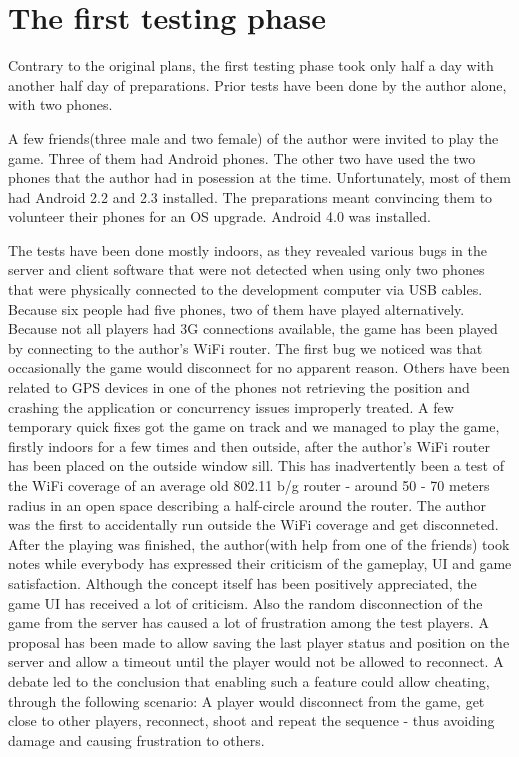 \documentclass{article}
\begin{document}
\section{The first testing phase}

Contrary to the original plans, the first testing phase took only half a day
with another half day of preparations. Prior tests have been done by the
author alone, with two phones.\newline

A few friends(three male and two female) of the author were invited to play the
game. Three of them had Android phones. The other two have used
the two phones that the author had in posession at the time. Unfortunately, most
of them had Android 2.2 and 2.3 installed. The preparations meant convincing
them to volunteer their phones for an OS upgrade. Android 4.0 was
installed.\newline

The tests have been done mostly indoors, as they revealed various bugs in the
server and client software that were not detected when using only two phones
that were physically connected to the development computer via USB
cables. Because six people had five phones, two of them have played
alternatively. Because not all players had 3G connections available, the game
has been played by connecting to the author's WiFi router. The first bug we
noticed was that occasionally the game would disconnect for no apparent reason.
Others have been related to GPS devices in one of the phones not retrieving the
position and crashing the application or concurrency issues improperly treated.
A few temporary quick fixes got the game on track and we managed to play the
game, firstly indoors for a few times and then outside, after the author's WiFi
router has been placed on the outside window sill. This has inadvertently been a
test of the WiFi coverage of an average old 802.11 b/g router - around 50 - 70
meters radius in an open space describing a half-circle around the router. The
author was the first to accidentally run outside the WiFi coverage and get
disconneted. After the playing was finished, the author(with help from one of
the friends) took notes while everybody has expressed their criticism of the
gameplay, UI and game satisfaction. Although the concept itself has been
positively appreciated, the game UI has received a lot of criticism. Also the
random disconnection of the game from the server has caused a lot of frustration
among the test players. A proposal has been made to allow saving the last
player status and position on the server and allow a timeout until the player
would not be allowed to reconnect. A debate led to the conclusion that
enabling such a feature could allow cheating, through the following scenario: A
player would disconnect from the game, get close to other players, reconnect,
shoot and repeat the sequence - thus avoiding damage and causing frustration to
others. \newline
\end{document}
